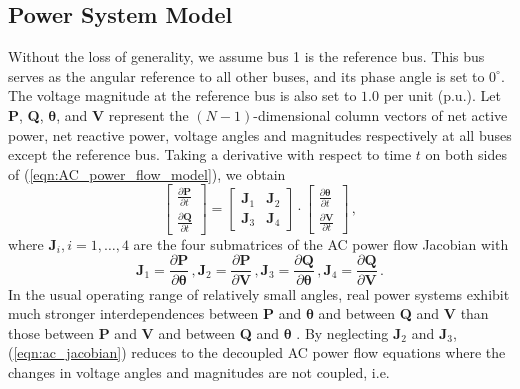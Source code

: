 \subsection{Power System Model}
\label{sec:power_model}
Without the loss of generality, we assume bus 1 is the reference bus. This bus serves as the angular reference to all other buses, and its phase angle is set to $0^\circ$. The voltage magnitude at the reference bus is also set to $1.0$ per unit (p.u.). Let \textbf{P}, \textbf{Q}, $\boldsymbol{\theta}$, and \textbf{V} represent the $(N-1)$-dimensional column vectors of net active power, net reactive power, voltage angles and magnitudes respectively at all buses except the reference bus. Taking a derivative with respect to time $t$ on both sides of (\ref{eqn:AC_power_flow_model}), we obtain
\begin{equation}
\label{eqn:ac_jacobian}
\left[\begin{array}{c} \frac{\partial \textbf{P}}{\partial t} \\[.5em] \frac{\partial \textbf{Q}}{\partial t}\end{array}\right]
=
\left[\begin{array}{c|c}
\mathbf{J}_1 & \mathbf{J}_2 \\
 \hline \mathbf{J}_3 & \mathbf{J}_4 
 \end{array}\right] 
\cdot \left[\begin{array}{c} \frac{\partial \boldsymbol{\theta}}{\partial t} \\[.5em] \frac{\partial \textbf{V}}{\partial t}\end{array}\right] \,,
\end{equation}
where $\mathbf{J}_i, i = 1, \dots, 4$ are the four submatrices of the AC power flow Jacobian with 
\begin{equation}
\mathbf{J}_1 = \frac{\partial \textbf{P}}{\partial \boldsymbol{\theta}} \,,  \mathbf{J}_2 = \frac{\partial \textbf{P}}{\partial \mathbf{V}} \,, \mathbf{J}_3 = \frac{\partial \textbf{Q}}{\partial \boldsymbol{\theta}} \,, \mathbf{J}_4 = \frac{\partial \textbf{Q}}{\partial \textbf{V}} \,.
\end{equation}
In the usual operating range of relatively small angles, real power systems exhibit much stronger interdependences between \textbf{P} and $\boldsymbol{\theta}$ and between \textbf{Q} and \textbf{V} than those between \textbf{P} and \textbf{V} and between \textbf{Q} and $\boldsymbol{\theta}$ \cite{murty2017power}. By neglecting $\mathbf{J}_2$ and $\mathbf{J}_3$, (\ref{eqn:ac_jacobian}) reduces to the decoupled AC power flow equations where the changes in voltage angles and magnitudes are not coupled, i.e. 
